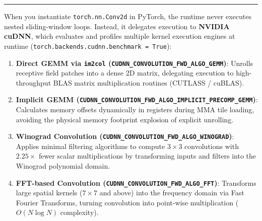 \documentclass[
  letterpaper,
]{scrbook}
\providecommand{\tightlist}{%
  \setlength{\itemsep}{0pt}\setlength{\parskip}{0pt}}
\begin{document}
\begin{center}\rule{0.5\linewidth}{0.5pt}\end{center}

\begin{tcolorbox}[enhanced jigsaw, arc=.35mm, bottomrule=.15mm, bottomtitle=1mm, breakable, colback=white, colbacktitle=quarto-callout-note-color!10!white, colframe=quarto-callout-note-color-frame, coltitle=black, left=2mm, leftrule=.75mm, opacityback=0, opacitybacktitle=0.6, rightrule=.15mm, title=\textcolor{quarto-callout-note-color}{\faInfo}\hspace{0.5em}{PyTorch Systems Bridge: \texttt{torch.nn.Conv2d},
\texttt{torch.nn.Unfold}, and cuDNN Engine Selection}, titlerule=0mm, toprule=.15mm, toptitle=1mm]

When you instantiate \texttt{torch.nn.Conv2d} in PyTorch, the runtime
never executes nested sliding-window loops. Instead, it delegates
execution to \textbf{NVIDIA cuDNN}, which evaluates and profiles
multiple kernel execution engines at runtime
(\texttt{torch.backends.cudnn.benchmark\ =\ True}):\footnotemark{}

\begin{enumerate}
\def\labelenumi{\arabic{enumi}.}
\tightlist
\item
  \textbf{Direct GEMM via \texttt{im2col}
  (\texttt{CUDNN\_CONVOLUTION\_FWD\_ALGO\_GEMM})}: Unrolls receptive
  field patches into a dense 2D matrix, delegating execution to
  high-throughput BLAS matrix multiplication routines (CUTLASS /
  cuBLAS).
\item
  \textbf{Implicit GEMM
  (\texttt{CUDNN\_CONVOLUTION\_FWD\_ALGO\_IMPLICIT\_PRECOMP\_GEMM})}:
  Calculates memory offsets dynamically in registers during MMA tile
  loading, avoiding the physical memory footprint explosion of explicit
  unrolling.
\item
  \textbf{Winograd Convolution
  (\texttt{CUDNN\_CONVOLUTION\_FWD\_ALGO\_WINOGRAD})}: Applies minimal
  filtering algorithms to compute \(3 \times 3\) convolutions with
  \(2.25\times\) fewer scalar multiplications by transforming inputs and
  filters into the Winograd polynomial domain.\footnotemark{}
\item
  \textbf{FFT-based Convolution
  (\texttt{CUDNN\_CONVOLUTION\_FWD\_ALGO\_FFT})}: Transforms large
  spatial kernels (\(7 \times 7\) and above) into the frequency domain
  via Fast Fourier Transforms, turning convolution into point-wise
  multiplication (\(O(N \log N)\) complexity).
\end{enumerate}


\end{tcolorbox}
\end{document}

